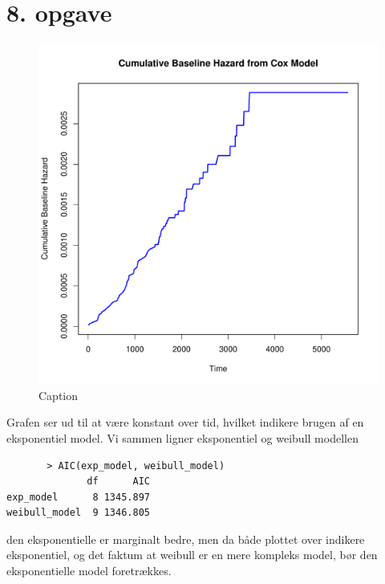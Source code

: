 \chapter{8. opgave}
\begin{figure}[h]
    \centering
    \includegraphics[width=0.6\linewidth]{Basses_kode/Billeder_duration/cumulative_baseline_hazard_over_time.pdf}
    \caption{Caption}
    \label{fig:enter-label}
\end{figure}
\noindent Grafen ser ud til at være konstant over tid, hvilket indikere brugen af en eksponentiel model.
\pause
Vi sammen ligner eksponentiel og weibull modellen
\begin{lstlisting}
       > AIC(exp_model, weibull_model)
              df      AIC
exp_model      8 1345.897
weibull_model  9 1346.805 
\end{lstlisting}
den eksponentielle er marginalt bedre, men da både plottet over indikere eksponentiel, og det faktum at weibull er en mere kompleks model, bør den eksponentielle model foretrækkes.